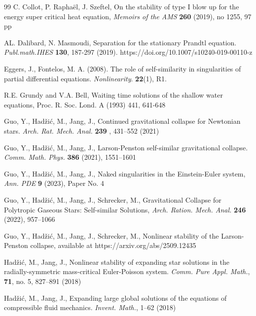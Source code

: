 \documentclass{article}
\numberwithin{equation}{section}
\begin{document}
\begin{thebibliography}{99}
{C. Collot, P. Raphaël, J. Szeftel,} On the stability of type I blow up for the energy
super critical heat equation, {\em Memoirs of the AMS} \textbf{260} (2019), no 1255, 97 pp

{AL. Dalibard, N. Masmoudi,} Separation for the stationary Prandtl equation. {\em Publ.math.IHES} \textbf{130}, 187-297 (2019). https://doi.org/10.1007/s10240-019-00110-z

Eggers, J., Fontelos, M. A. (2008). The role of self-similarity in singularities of partial differential equations. 
{\em Nonlinearity}. {\bf{22}}(1), R1. 







 R.E. Grundy and V.A. Bell, Waiting time solutions of the shallow water equations, Proc. R. Soc. Lond. A (1993) 441, 641-648






Guo, Y., Had\v zi\'c, M., Jang, J.,
Continued gravitational collapse for Newtonian stars. 
{\em Arch. Rat. Mech. Anal.} {\bf 239} , 431--552 (2021) 


{Guo, Y., Had\v zi\'c, M., Jang, J.}, Larson-Penston self-similar gravitational collapse. 
\emph{Comm. Math. Phys.} \textbf{386} (2021), 1551--1601 

{Guo, Y., Had\v zi\'c, M., Jang, J.}, Naked singularities in the Einstein-Euler system, \emph{Ann. PDE} \textbf{9} (2023), Paper No. 4

Guo, Y., Had\v zi\'c, M., Jang, J., Schrecker, M.,   
Gravitational Collapse for Polytropic Gaseous Stars: Self-similar Solutions, \emph{Arch. Ration. Mech. Anal.} \textbf{246} (2022), 957--1066 

Guo, Y., Had\v zi\'c, M., Jang, J., Schrecker, M., 
Nonlinear stability of the Larson-Penston collapse, available at https://arxiv.org/abs/2509.12435 


Had\v{z}i\'c, M., Jang, J.,
Nonlinear stability of expanding star solutions in the radially-symmetric mass-critical Euler-Poisson system. 
{\em Comm. Pure Appl. Math.}, 
{\bf 71}, no. 5,   827--891 (2018)

Had\v zi\'c, M., Jang, J.,
Expanding large global solutions of the equations of compressible fluid mechanics.
{\em Invent. Math.}, 1--62 (2018)


\end{thebibliography}
\end{document}
